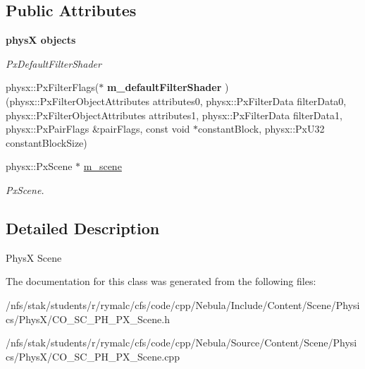 \subsection*{Public Attributes}
\begin{Indent}{\bf physX objects}\par
{\em \label{_amgrp29dc2719356b85274d5e33d2a63db97d}
 PxDefaultFilterShader }\begin{DoxyCompactItemize}
\item 
\hypertarget{classContent_1_1Scene_1_1Physics_1_1PhysX_1_1Scene_a46ac32cdab1aa656a427f96c37744a75}{
physx::PxFilterFlags($\ast$ {\bfseries m\_\-defaultFilterShader} )(physx::PxFilterObjectAttributes attributes0, physx::PxFilterData filterData0, physx::PxFilterObjectAttributes attributes1, physx::PxFilterData filterData1, physx::PxPairFlags \&pairFlags, const void $\ast$constantBlock, physx::PxU32 constantBlockSize)}
\label{classContent_1_1Scene_1_1Physics_1_1PhysX_1_1Scene_a46ac32cdab1aa656a427f96c37744a75}

\item 
\hypertarget{classContent_1_1Scene_1_1Physics_1_1PhysX_1_1Scene_a2f596bac082cdd04d3b4b5815d612554}{
physx::PxScene $\ast$ \hyperlink{classContent_1_1Scene_1_1Physics_1_1PhysX_1_1Scene_a2f596bac082cdd04d3b4b5815d612554}{m\_\-scene}}
\label{classContent_1_1Scene_1_1Physics_1_1PhysX_1_1Scene_a2f596bac082cdd04d3b4b5815d612554}

\begin{DoxyCompactList}\small\item\em PxScene. \item\end{DoxyCompactList}\end{DoxyCompactItemize}
\end{Indent}


\subsection{Detailed Description}
PhysX Scene 

The documentation for this class was generated from the following files:\begin{DoxyCompactItemize}
\item 
/nfs/stak/students/r/rymalc/cfs/code/cpp/Nebula/Include/Content/Scene/Physics/PhysX/CO\_\-SC\_\-PH\_\-PX\_\-Scene.h\item 
/nfs/stak/students/r/rymalc/cfs/code/cpp/Nebula/Source/Content/Scene/Physics/PhysX/CO\_\-SC\_\-PH\_\-PX\_\-Scene.cpp\end{DoxyCompactItemize}
